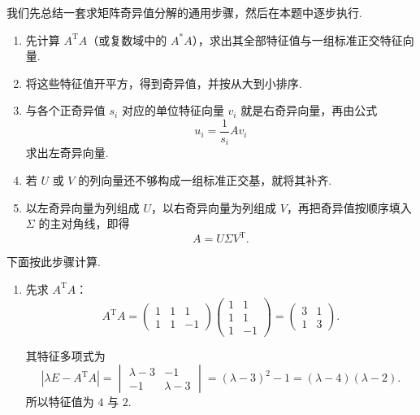 \begin{solution}
    我们先总结一套求矩阵奇异值分解的通用步骤，然后在本题中逐步执行.

    \begin{enumerate}
        \item 先计算 $A^{\mathrm{T}}A$（或复数域中的 $A^*A$），求出其全部特征值与一组标准正交特征向量.

        \item 将这些特征值开平方，得到奇异值，并按从大到小排序.

        \item 与各个正奇异值 $s_i$ 对应的单位特征向量 $v_i$ 就是右奇异向量，再由公式
              \[
                  u_i = \frac{1}{s_i}Av_i
              \]
              求出左奇异向量.

        \item 若 $U$ 或 $V$ 的列向量还不够构成一组标准正交基，就将其补齐.

        \item 以左奇异向量为列组成 $U$，以右奇异向量为列组成 $V$，再把奇异值按顺序填入 $\Sigma$ 的主对角线，即得
              \[
                  A = U\Sigma V^{\mathrm{T}}.
              \]
    \end{enumerate}

    下面按此步骤计算.

    \begin{enumerate}
        \item 先求 $A^{\mathrm{T}}A$：
              \[
                  A^{\mathrm{T}}A =
                  \begin{pmatrix}
                      1 & 1 & 1  \\
                      1 & 1 & -1
                  \end{pmatrix}
                  \begin{pmatrix}
                      1 & 1  \\
                      1 & 1  \\
                      1 & -1
                  \end{pmatrix}
                  =
                  \begin{pmatrix}
                      3 & 1 \\
                      1 & 3
                  \end{pmatrix}.
              \]

              其特征多项式为
              \[
                  \left| \lambda E - A^{\mathrm{T}}A \right|
                  =
                  \begin{vmatrix}
                      \lambda - 3 & -1          \\
                      -1          & \lambda - 3
                  \end{vmatrix}
                  =
                  (\lambda - 3)^2 - 1
                  =
                  (\lambda - 4)(\lambda - 2).
              \]
              所以特征值为 $4$ 与 $2$.


\end{enumerate}
\end{solution}
